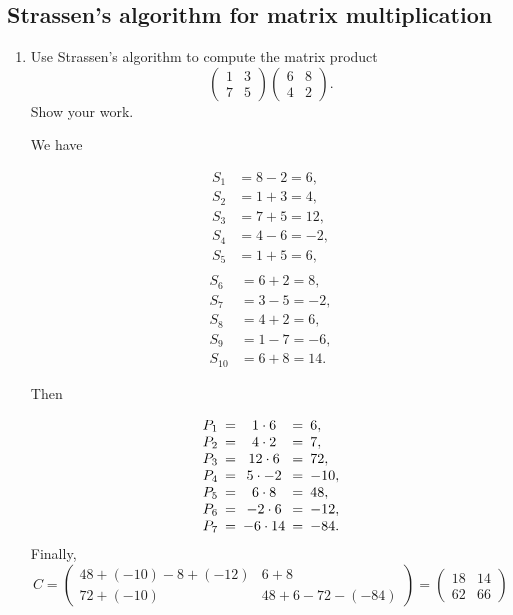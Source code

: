 \documentclass[Chapter04]{subfiles}
\begin{document}
	\subsection{Strassen's algorithm for matrix multiplication}

	\begin{enumerate}
		\item Use Strassen's algorithm to compute the matrix product
		\[
			\begin{pmatrix}
				1 & 3\\
				7 & 5
			\end{pmatrix}
			\begin{pmatrix}
				6 & 8\\
				4 & 2
			\end{pmatrix}.
		\]
		Show your work.
		\begin{answer}
			We have
			\begin{multicols}{2}
				\noindent
				\begin{align*}
					S_1 &= 8 - 2 = 6,\\
					S_2 &= 1 + 3 = 4,\\
					S_3 &= 7 + 5 = 12,\\
					S_4 &= 4 - 6 = -2,\\
					S_5 &= 1 + 5 = 6,\\
				\end{align*}
				\begin{align*}
					S_6 &= 6 + 2 = 8,\\
					S_7 &= 3 - 5 = -2,\\
					S_8 &= 4 + 2 = 6,\\
					S_9 &= 1 - 7 = -6,\\
					S_{10} &= 6 + 8 = 14.
				\end{align*}
			\end{multicols}
			Then

			\[
				\begin{array}{r!{=}c!{=}l}
					P_1 & 1 \cdot 6  & 6,\\
					P_2 & 4 \cdot 2  & 7,\\
					P_3 & 12 \cdot 6 & 72,\\
					P_4 & 5 \cdot -2 & -10,\\
					P_5 & 6 \cdot 8  & 48,\\
					P_6 & -2 \cdot 6 & -12,\\
					P_7 & -6 \cdot 14 & -84.
				\end{array}
			\]
			Finally,
			\[
				C =
				\begin{pmatrix}
					48 + (-10) - 8 + (-12) & 6 + 8\\
					72 + (-10) & 48 + 6 - 72 - (-84)
				\end{pmatrix}
				=
				\begin{pmatrix}
					18 & 14\\
					62 & 66
				\end{pmatrix}
			\]
		\end{answer}


\end{enumerate}
\end{document}
